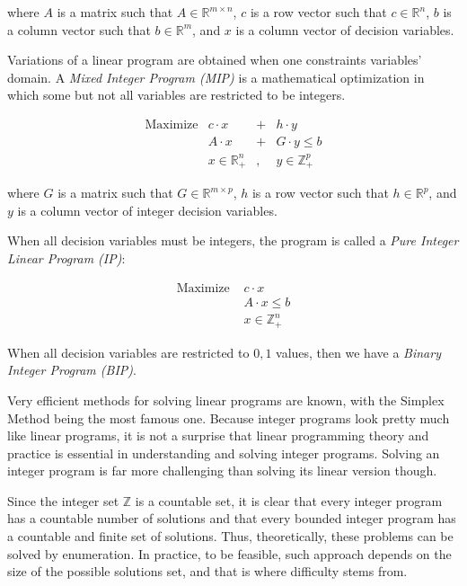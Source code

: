 where $A$ is a matrix such that $A \in \mathbb{R}^{m \times n}$, $c$ is a row vector such that $c \in \mathbb{R}^n$, $b$ is a column vector such that $b \in \mathbb{R}^m$, and $x$ is a column vector of decision variables.

Variations of a linear program are obtained when one constraints variables' domain. A \textit{Mixed Integer Program (MIP)} is a mathematical optimization in which some but not all variables are restricted to be integers. 

$$
\begin{array}{rlll}
   \mbox{Maximize} & c \cdot x & +  & h \cdot y
								\\ & A \cdot x & +  & G \cdot y \le b
								\\ & x \in \mathbb{R}^{n}_{+} &, & y \in \mathbb{Z}^{p}_{+}
\end{array}
$$

where $G$ is a matrix such that $G \in \mathbb{R}^{m \times p}$, $h$ is a row vector such that $h \in \mathbb{R}^p$, and $y$ is a column vector of integer decision variables.

When all decision variables must be integers, the program is called a \textit{Pure Integer Linear Program (IP)}:

\begin{subequations}
\label{eq:IP}
\begin{align}
   \mbox{Maximize } & c \cdot x
								\\ & A \cdot x \le b
								\\ & x \in \mathbb{Z}^{n}_{+}
\end{align}
\end{subequations}

When all decision variables are restricted to ${0,1}$ values, then we have a \textit{Binary Integer Program (BIP)}.

Very efficient methods for solving linear programs are known, with the Simplex Method being the most famous one. Because integer programs look pretty much like linear programs, it is not a surprise that linear programming theory and practice is essential in understanding and solving integer programs. Solving an integer program is far more challenging than solving its linear version though.

Since the integer set $\mathbb{Z}$ is a countable set, it is clear that every integer program has a countable number of solutions and that every bounded integer program has a countable and finite set of solutions. Thus, theoretically, these problems can be solved by enumeration. In practice, to be feasible, such approach depends on the size of the possible solutions set, and that is where difficulty stems from.


